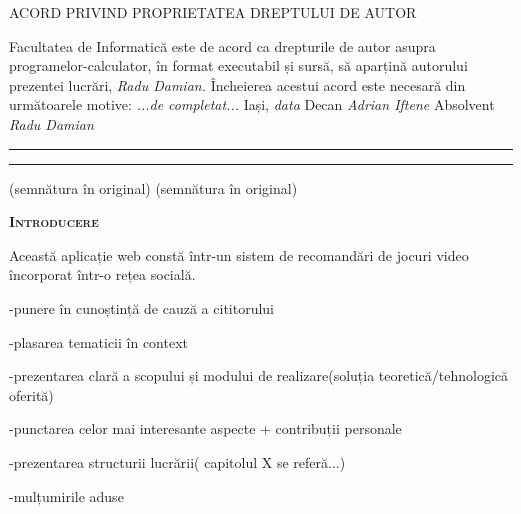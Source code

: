 \documentclass[12pt,a4paper]{report}
\begin{document}
\begin{titlepage}

	\hfill \break
	\begin{center}
	ACORD PRIVIND PROPRIETATEA DREPTULUI DE AUTOR
	\end{center}
	
	\hfill \break
	\hfill \break
	\justifying
	Facultatea de Informatică este de acord ca drepturile
	de autor asupra programelor-calculator, în format
	executabil și sursă, să aparțină autorului prezentei
	lucrări, \emph{Radu Damian.}
	\hfill \break
	\hfill \break
	Încheierea acestui acord este necesară din următoarele
	motive:
	\hfill \break
	\hfill \break
	\hfill \break
	\emph{...de completat...}
	\hfill \break
	\hfill \break
	\hfill \break
	\hfill \break
	\hfill \break
	\hfill \break
	Iași, \emph{data}
	\hfill \break
	\hfill \break
	\hfill \break
	Decan \emph{Adrian Iftene} \hspace{18em} Absolvent \emph{Radu Damian}  
	\hfill \break
	\hfill \break
	\rule{4.5cm}{0.15mm} \hspace{16em} \rule{4.5cm}{0.15mm}
	(semnătura în original) \hspace{17em} (semnătura în original)
	
	
	

\end{titlepage}

\renewcommand*{\contentsname}{Cuprins}
\tableofcontents
\newpage

	\hfill \break
	\begin{center}
	{\scshape\large \textbf{Introducere} \par}
	\end{center}
	
	Această aplicație web constă într-un sistem de recomandări de jocuri video încorporat într-o rețea socială.
	
	-punere în cunoștință de cauză a cititorului
	
	-plasarea tematicii în context
	
	-prezentarea clară a scopului și modului de realizare(soluția teoretică/tehnologică oferită)
	
	-punctarea celor mai interesante aspecte + contribuții personale
	
	-prezentarea structurii lucrării( capitolul X se referă...)
	
	-mulțumirile aduse
	
	\newpage
	
    
	
\renewcommand\thesection{\arabic{section}}
\end{document}
